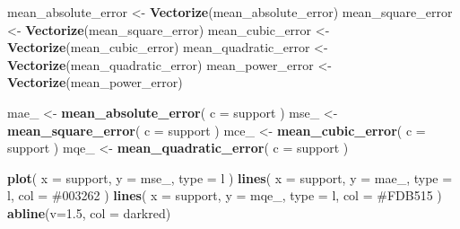 \documentclass[
]{book}
\newenvironment{Shaded}{\begin{snugshade}}{\end{snugshade}}
\newcommand{\AttributeTok}[1]{\textcolor[rgb]{0.13,0.29,0.53}{#1}}
\newcommand{\FloatTok}[1]{\textcolor[rgb]{0.00,0.00,0.81}{#1}}
\newcommand{\FunctionTok}[1]{\textcolor[rgb]{0.13,0.29,0.53}{\textbf{#1}}}
\newcommand{\NormalTok}[1]{#1}
\newcommand{\OtherTok}[1]{\textcolor[rgb]{0.56,0.35,0.01}{#1}}
\newcommand{\StringTok}[1]{\textcolor[rgb]{0.31,0.60,0.02}{#1}}
\theoremstyle{definition}
\theoremstyle{definition}
\theoremstyle{definition}
\theoremstyle{definition}
\theoremstyle{remark}
\begin{document}
\begin{Shaded}
\begin{Highlighting}[]
\NormalTok{mean\_absolute\_error  }\OtherTok{\textless{}{-}} \FunctionTok{Vectorize}\NormalTok{(mean\_absolute\_error)}
\NormalTok{mean\_square\_error    }\OtherTok{\textless{}{-}} \FunctionTok{Vectorize}\NormalTok{(mean\_square\_error)}
\NormalTok{mean\_cubic\_error     }\OtherTok{\textless{}{-}} \FunctionTok{Vectorize}\NormalTok{(mean\_cubic\_error)}
\NormalTok{mean\_quadratic\_error }\OtherTok{\textless{}{-}} \FunctionTok{Vectorize}\NormalTok{(mean\_quadratic\_error)}
\NormalTok{mean\_power\_error     }\OtherTok{\textless{}{-}} \FunctionTok{Vectorize}\NormalTok{(mean\_power\_error)}
\end{Highlighting}
\end{Shaded}

\begin{Shaded}
\begin{Highlighting}[]
\NormalTok{mae\_ }\OtherTok{\textless{}{-}} \FunctionTok{mean\_absolute\_error}\NormalTok{(}
  \AttributeTok{c =}\NormalTok{ support}
\NormalTok{)}
\NormalTok{mse\_ }\OtherTok{\textless{}{-}} \FunctionTok{mean\_square\_error}\NormalTok{(}
  \AttributeTok{c =}\NormalTok{ support}
\NormalTok{  )}
\NormalTok{mce\_ }\OtherTok{\textless{}{-}} \FunctionTok{mean\_cubic\_error}\NormalTok{(}
  \AttributeTok{c =}\NormalTok{ support}
\NormalTok{)}
\NormalTok{mqe\_ }\OtherTok{\textless{}{-}} \FunctionTok{mean\_quadratic\_error}\NormalTok{(}
  \AttributeTok{c =}\NormalTok{ support}
\NormalTok{)}
\end{Highlighting}
\end{Shaded}

\begin{Shaded}
\begin{Highlighting}[]
\FunctionTok{plot}\NormalTok{(}
  \AttributeTok{x =}\NormalTok{ support,}
  \AttributeTok{y =}\NormalTok{ mse\_,}
  \AttributeTok{type =} \StringTok{\textquotesingle{}l\textquotesingle{}}
\NormalTok{)}
\FunctionTok{lines}\NormalTok{(}
  \AttributeTok{x =}\NormalTok{ support, }
  \AttributeTok{y =}\NormalTok{ mae\_, }
  \AttributeTok{type =} \StringTok{\textquotesingle{}l\textquotesingle{}}\NormalTok{, }
  \AttributeTok{col =} \StringTok{\textquotesingle{}\#003262\textquotesingle{}}
\NormalTok{)}
\FunctionTok{lines}\NormalTok{(}
  \AttributeTok{x =}\NormalTok{ support, }
  \AttributeTok{y =}\NormalTok{ mqe\_, }
  \AttributeTok{type =} \StringTok{\textquotesingle{}l\textquotesingle{}}\NormalTok{, }
  \AttributeTok{col =} \StringTok{\textquotesingle{}\#FDB515\textquotesingle{}}
\NormalTok{)}
\FunctionTok{abline}\NormalTok{(}\AttributeTok{v=}\FloatTok{1.5}\NormalTok{, }\AttributeTok{col =} \StringTok{\textquotesingle{}darkred\textquotesingle{}}\NormalTok{)}
\end{Highlighting}
\end{Shaded}
\end{document}
